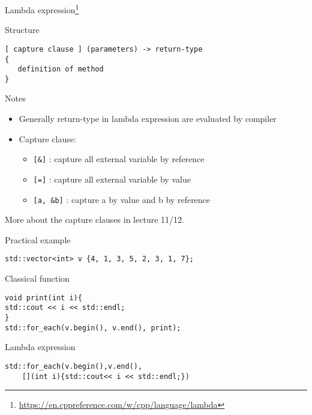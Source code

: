 \documentclass[12pt,t]{beamer}
\begin{document}
\begin{frame}[fragile]{Lambda expression\footnote{\tiny{\url{https://en.cppreference.com/w/cpp/language/lambda}}} }

\begin{block}{Structure}
\begin{lstlisting}
[ capture clause ] (parameters) -> return-type  
{   
   definition of method   
} 
\end{lstlisting}
\end{block}

\begin{block}{Notes}
\begin{itemize}
\item Generally return-type in lambda expression are evaluated by compiler
\item Capture clause:
\begin{itemize}
\item  \lstinline|[&]| : capture all external variable by reference
\item  \lstinline|[=]| : capture all external variable by value
\item  \lstinline|[a, &b]| : capture a by value and b by reference
\end{itemize}
\end{itemize}
\end{block}
\vspace{-0.2cm}
\begin{center}
More about the capture clauses in lecture 11/12.
\end{center}
\end{frame}

\begin{frame}[fragile]{Practical example}
\begin{lstlisting}
std::vector<int> v {4, 1, 3, 5, 2, 3, 1, 7}; 

\end{lstlisting}


\begin{block}{Classical function}
\begin{lstlisting}
void print(int i){
std::cout << i << std::endl;
}
std::for_each(v.begin(), v.end(), print); 
\end{lstlisting}
\end{block}

\begin{block}{Lambda expression}
\begin{lstlisting}
std::for_each(v.begin(),v.end(),
	[](int i){std::cout<< i << std::endl;})
\end{lstlisting}
\end{block}


\end{frame}
     
\end{document}
